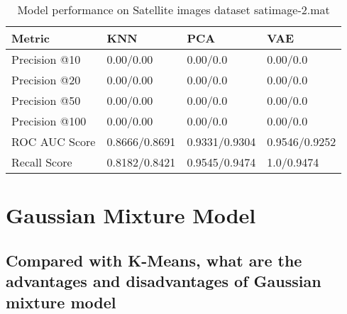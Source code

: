 \documentclass[11pt]{article}
\begin{document}
\begin{table}[]
\begin{tabular}{|l|l|l|l|}
Metric        & KNN & PCA     & VAE  \\ \hline
Precision @10 & 0.00/0.00       & 0.00/0.0    &  0.00/0.0   \\ \hline
Precision @20 & 0.00/0.00       & 0.00/0.0    &  0.00/0.0   \\ \hline
Precision @50 & 0.00/0.00       & 0.00/0.0    &  0.00/0.0   \\ \hline
Precision @100 & 0.00/0.00       & 0.00/0.0    &  0.00/0.0   \\ \hline
ROC AUC Score & 0.8666/0.8691   & 0.9331/0.9304 & 0.9546/0.9252 \\ \hline
Recall Score  & 0.8182/0.8421   & 0.9545/0.9474 & 1.0/0.9474 \hline
\end{tabular}
\caption{Model performance on Satellite images dataset satimage-2.mat}
\label{tab:satimage}
\end{table}
\section{Gaussian Mixture Model}
\subsection{Compared with K-Means, what are the advantages and disadvantages of Gaussian mixture model}
\end{document}
